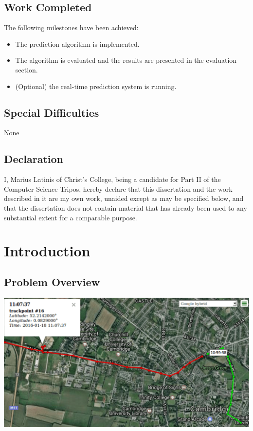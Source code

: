 \documentclass[12pt,a4paper,oneside,openright]{report}
\begin{document}
\section*{Work Completed}

The following milestones have been achieved:

\begin{itemize}
\item The prediction algorithm is implemented.
\item The algorithm is evaluated and the results are presented in the evaluation section.
\item (Optional) the real-time prediction system is running.
\end{itemize}

\section*{Special Difficulties}

None
 
\section*{Declaration}

I, Marius Latinis of Christ's College, being a candidate for Part II of the Computer
Science Tripos, hereby declare that this dissertation and the work described 
in it are my own work, unaided except as may be specified below,
and that the dissertation does not contain material that has already been used to any substantial extent for a comparable purpose.

\bigskip
{}

\medskip
{}

\tableofcontents


\pagestyle{plain}


\chapter{Introduction}

\section{Problem Overview}

\includegraphics[width=\textwidth]{figs/problem_overview.png} \\
\end{document}

